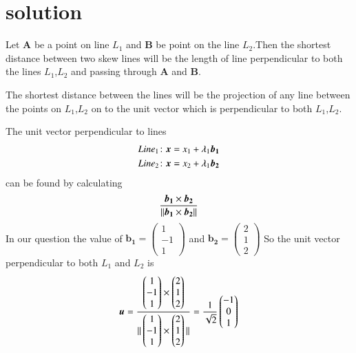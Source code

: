 \documentclass[journal,12pt,twocolumn]{IEEEtran}
\newcommand{\norm}[1]{\| #1 \|}
\begin{document}
\section{solution}
Let $\bm{A}$ be a point on line $L_1$ and $\bm{B}$ be point on the line $L_2$.Then the shortest distance between two skew lines will be the length of line perpendicular to both the lines $L_1$,$L_2$ and passing through $\bm{A}$ and $\bm{B}$.\par
The shortest distance between the lines will be the projection of any line between the points on $L_1$,$L_2$ on to the unit vector which is perpendicular to both $L_1$,$L_2$.\par
The unit vector perpendicular to lines \\
\begin{align}
    Line_1\colon \bm{x}=x_1+\lambda_1\bm{b_1}\notag\\
    Line_2\colon \bm{x}=x_2+\lambda_1\bm{b_2}\notag
\end{align}
can be found by calculating
\begin{align}
    \frac{\bm{b_1}\times\bm{b_2}}{\norm{\bm{b_1}\times\bm{b_2}}}\notag
\end{align}
In our question the value of $\bm{b_1}=\begin{pmatrix}1\\-1\\1\end{pmatrix}$ and $\bm{b_2}=\begin{pmatrix}2\\1\\2\end{pmatrix}$
So the unit vector perpendicular to both $L_1$ and $L_2$ is
\begin{align}
    \bm{u}=\frac{\begin{pmatrix}1\\-1\\1\end{pmatrix}\times\begin{pmatrix}2\\1\\2\end{pmatrix}}{\norm{\begin{pmatrix}1\\-1\\1\end{pmatrix}\times\begin{pmatrix}2\\1\\2\end{pmatrix}}}=\frac{1}{\sqrt{2}}\begin{pmatrix}-1\\0\\1\end{pmatrix}\notag
\end{align}
\end{document}
